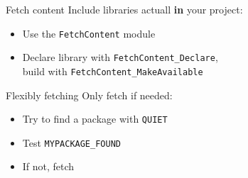 \begin{numberedframe}{Fetch content}
Include libraries actuall \textbf{in} your project:
  \begin{itemize}
  \item Use the \lstinline{FetchContent} module
  \item Declare library with \lstinline{FetchContent_Declare},\\
    build with \lstinline{FetchContent_MakeAvailable}
  \end{itemize}
  
\end{numberedframe}

\begin{numberedframe}{Flexibly fetching}
  Only fetch if needed:
  \begin{itemize}
  \item   Try to find a package with \lstinline{QUIET}
  \item Test \lstinline{MYPACKAGE_FOUND}
  \item If not, fetch
  \end{itemize}
  
\end{numberedframe}



\endinput

\begin{numberedframe}{}
  \begin{itemize}
  \item 
  \end{itemize}
\begin{lstlisting}
\end{lstlisting}
\end{numberedframe}

